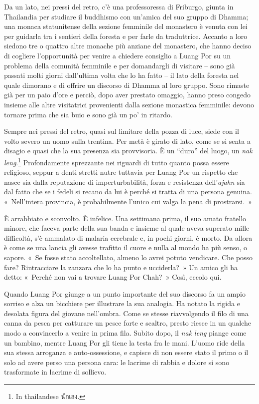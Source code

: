 Da un lato, nei pressi del retro, c'è una professoressa di Friburgo,
giunta in Thailandia per studiare il buddhismo con un'amica del suo
gruppo di Dhamma; una monaca statunitense della sezione femminile del
monastero è venuta con lei per guidarla tra i sentieri della foresta e
per farle da traduttrice. Accanto a loro siedono tre o quattro altre
monache più anziane del monastero, che hanno deciso di cogliere
l'opportunità per venire a chiedere consiglio a Luang Por su un problema
della comunità femminile e per domandargli di visitare -- sono già
passati molti giorni dall'ultima volta che lo ha fatto -- il lato della
foresta nel quale dimorano e di offrire un discorso di Dhamma al loro
gruppo. Sono rimaste già per un paio d'ore e perciò, dopo aver prestato
omaggio, hanno preso congedo insieme alle altre visitatrici provenienti
dalla sezione monastica femminile: devono tornare prima che sia buio e
sono già un po' in ritardo.

Sempre nei pressi del retro, quasi sul limitare della pozza di luce,
siede con il volto severo un uomo sulla trentina. Per metà è girato di
lato, come se si senta a disagio e quasi che la sua presenza sia
provvisoria. È un ``duro'' del luogo, un \emph{nak leng}.\footnote{In
  thailandese นักเลง.} Profondamente sprezzante nei riguardi di tutto
quanto possa essere religioso, seppur a denti stretti nutre tuttavia per
Luang Por un rispetto che nasce sia dalla reputazione di
imperturbabilità, forza e resistenza dell'\emph{ajahn} sia dal fatto che
se i fedeli si recano da lui è perché si tratta di una persona genuina.
«~Nell'intera provincia, è probabilmente l'unico cui valga la pena di
prostrarsi.~»

È arrabbiato e sconvolto. È infelice. Una settimana prima, il suo amato
fratello minore, che faceva parte della sua banda e insieme al quale
aveva superato mille difficoltà, s'è ammalato di malaria cerebrale e, in
pochi giorni, è morto. Da allora è come se una lancia gli avesse
trafitto il cuore e nulla al mondo ha più senso, o sapore. «~Se fosse
stato accoltellato, almeno lo avrei potuto vendicare. Che posso fare?
Rintracciare la zanzara che lo ha punto e ucciderla?~» Un amico gli ha
detto: «~Perché non vai a trovare Luang Por Chah?~» Così, eccolo qui.

Quando Luang Por giunge a un punto importante del suo discorso fa un
ampio sorriso e alza un bicchiere per illustrare la sua analogia. Ha
notato la rigida e desolata figura del giovane nell'ombra. Come se
stesse riavvolgendo il filo di una canna da pesca per catturare un pesce
forte e scaltro, presto riesce in un qualche modo a convincerlo a venire
in prima fila. Subito dopo, il \emph{nak leng} piange come un bambino,
mentre Luang Por gli tiene la testa fra le mani. L'uomo ride della sua
stessa arroganza e auto-ossessione, e capisce di non essere stato il
primo o il solo ad avere perso una persona cara: le lacrime di rabbia e
dolore si sono trasformate in lacrime di sollievo.

